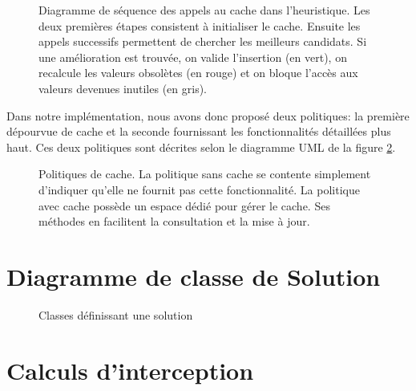 	\begin{figure}[H]
		\centering
		\begin{tikzpicture}
			
		\end{tikzpicture}
		\caption[Diagramme de séquence des appels au cache dans l'heuristique]{Diagramme de séquence des appels au cache dans l'heuristique. {\scriptsize Les deux premières étapes consistent à initialiser le cache. Ensuite les appels successifs permettent de chercher les meilleurs candidats. Si une amélioration est trouvée, on valide l'insertion (en vert), on recalcule les valeurs obsolètes (en rouge) et on bloque l'accès aux valeurs devenues inutiles (en gris).}}
		\label{diag:cache}
	\end{figure}

	Dans notre implémentation, nous avons donc proposé deux politiques: la première dépourvue de cache et la seconde fournissant les fonctionnalités détaillées plus haut. Ces deux politiques sont décrites selon le diagramme UML de la figure \ref{uml:cache_policies}.

	\begin{figure}[h]
		\centering
		\begin{tikzpicture}
						
		\end{tikzpicture}
		\caption[UML -- Politiques de cache]{Politiques de cache. {\scriptsize La politique sans cache se contente simplement d'indiquer qu'elle ne fournit pas cette fonctionnalité. La politique avec cache possède un espace dédié pour gérer le cache. Ses méthodes en facilitent la consultation et la mise à jour.}}
		\label{uml:cache_policies}
	\end{figure}

\chapter{Diagramme de classe de Solution}

	\vspace*{-1cm}
	\begin{figure}[h!]
		\centering
		\begin{tikzpicture}
			
		\end{tikzpicture}
		\caption{Classes définissant une solution}
		\label{fig:solution-uml}
	\end{figure}
	
\chapter{Calculs d'interception}

